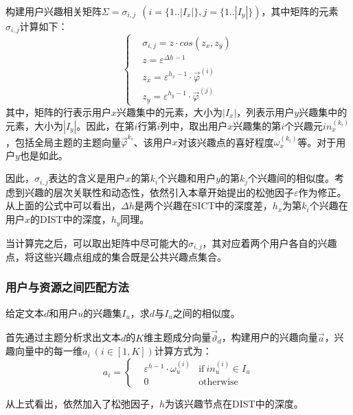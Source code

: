 构建用户兴趣相关矩阵$\Sigma={\sigma_{i,j}}~~(i=\{1..|I_x|\},j=\{1..|I_y|\})$，其中矩阵的元素$\sigma_{i,j}$计算如下：
\begin{equation}
  \left\{
  \begin{aligned}
    & \sigma_{i,j}=z \cdot cos(z_x,z_y) \\
    & z=\varepsilon^{\Delta h-1} \\
    & z_x=\varepsilon^{h_x-1}\cdot \vec{\varphi}^{(i)} \\
    & z_y=\varepsilon^{h_y-1}\cdot \vec{\varphi}^{(j)}
  \end{aligned}
  \right.
\end{equation}
其中，矩阵的行表示用户$x$兴趣集中的元素，大小为$|I_x|$，列表示用户$y$兴趣集中的元素，大小为$|I_y|$。因此，在第$i$行第$i$列中，取出用户$x$兴趣集的第$i$个兴趣元$in_{x}^{(k_i)}$，包括全局主题的主题向量$\vec{\varphi}^{k_i}$、该用户$x$对该兴趣点的喜好程度$\omega_x^{(k_i)}$等。对于用户$y$也是如此。

因此，$\sigma_{i,j}$表达的含义是用户$x$的第$k_i$个兴趣和用户$y$的第$k_j$个兴趣间的相似度。考虑到兴趣的层次关联性和动态性，依然引入本章开始提出的松弛因子$\varepsilon$作为修正。从上面的公式中可以看出，$\Delta h$是两个兴趣在SICT中的深度差，$h_x$为第$k_i$个兴趣在用户$x$的DIST中的深度，$h_y$同理。

当计算完之后，可以取出矩阵中尽可能大的$\sigma_{i,j}$，其对应着两个用户各自的兴趣点，将这些兴趣点组成的集合既是公共兴趣点集合。

\subsubsection{用户与资源之间匹配方法}
\begin{mydef}[用户与资源间匹配问题]
  给定文本$d$和用户$u$的兴趣集$I_u$，求$d$与$I_u$之间的相似度。
\end{mydef}

首先通过主题分析求出文本$d$的$K$维主题成分向量$\vec{\vartheta}_d$，构建用户的兴趣向量$\vec{a}$，兴趣向量中的每一维$a_i~(i\in[1,K])$计算方式为：
\begin{equation}
  a_i=\left\{
  \begin{aligned}
    & \varepsilon^{h-1}\cdot \omega_u^{(i)} & \mbox{if}~in_u^{(i)} \in I_u \\
    & 0 & \mbox{otherwise}
  \end{aligned}
  \right.
\end{equation}

从上式看出，依然加入了松弛因子，$h$为该兴趣节点在DIST中的深度。

